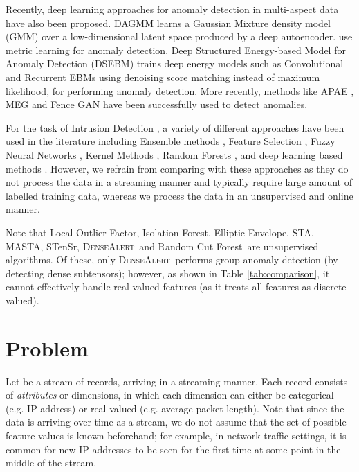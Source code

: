\documentclass[sigconf]{acmart}
\newcommand{\densealert}{\textsc{DenseAlert}}
\newcommand{\rcf}{Random Cut Forest}
\newcommand{\iso}{Isolation Forest}
\newcommand{\elliptic}{Elliptic Envelope}
\newcommand{\lof}{Local Outlier Factor}
\begin{document}
Recently, deep learning approaches for anomaly detection in multi-aspect data have also been proposed. DAGMM \cite{zong2018deep} learns a Gaussian Mixture density model (GMM) over a low-dimensional latent space produced by a deep autoencoder. \cite{JU2020167} use metric learning for anomaly detection. Deep Structured Energy-based Model for Anomaly Detection (DSEBM) \cite{zhai2016deep} trains deep energy models such as Convolutional and Recurrent EBMs using denoising score matching instead of maximum likelihood, for performing anomaly detection. More recently, methods like APAE \cite{Goodge2020RobustnessOA}, MEG \cite{kumar2019maximum} and Fence GAN \cite{ngo2019} have been successfully used to detect anomalies. 

For the task of Intrusion Detection \cite{Gradison2018, 1565245, 10.1145/3143361.3143399, 10.1016/j.cose.2006.05.005, WANG2014103, 4400777}, a variety of different approaches have been used in the literature including Ensemble methods \cite{DBLP:journals/scn/RajagopalKH20}, Feature Selection \cite{c5d37e2294e349d59233c4b6e41cae3a}, Fuzzy Neural Networks \cite{fuzzynn}, Kernel Methods \cite{10.1007/11427469_77}, Random Forests \cite{8766544}, and deep learning based methods \cite{8681044} \cite{8643036}. However, we refrain from comparing with these approaches as they do not process the data in a streaming manner and typically require large amount of labelled training data, whereas we process the data in an unsupervised and online manner. 

Note that \lof, \iso, \elliptic, STA, MASTA, STenSr, \densealert\ and \rcf\ are unsupervised algorithms. Of these, only \densealert\ performs group anomaly detection (by detecting dense subtensors); however, as shown in Table \ref{tab:comparison}, it cannot effectively handle real-valued features (as it treats all features as discrete-valued).
 \section{Problem}

Let  be a stream of records, arriving in a streaming manner. Each record  consists of  \emph{attributes} or dimensions, in which each dimension can either be categorical (e.g. IP address) or real-valued (e.g. average packet length). Note that since the data is arriving over time as a stream, we do not assume that the set of possible feature values is known beforehand; for example, in network traffic settings, it is common for new IP addresses to be seen for the first time at some point in the middle of the stream.
\end{document}
